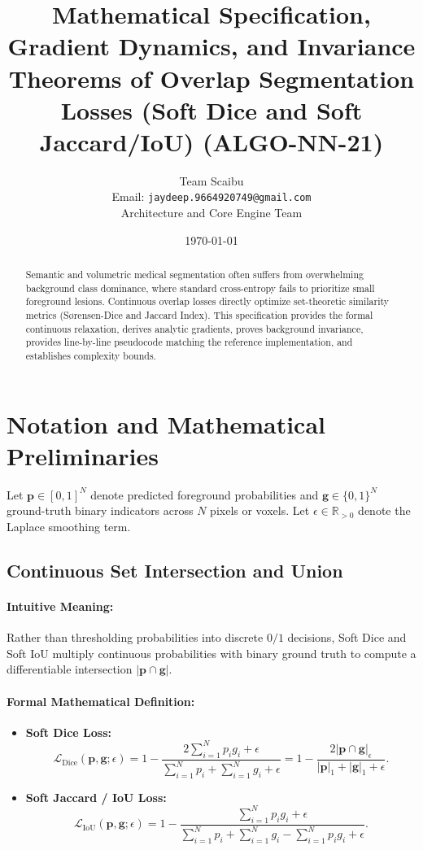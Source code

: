 \documentclass[11pt]{article}
\title{\textbf{Mathematical Specification, Gradient Dynamics, and Invariance Theorems of Overlap Segmentation Losses (Soft Dice and Soft Jaccard/IoU) (ALGO-NN-21)}}
\author{Team Scaibu \\ \small Email: \texttt{jaydeep.9664920749@gmail.com} \\ \small Architecture and Core Engine Team}
\date{\today}
\begin{document}
\maketitle

\begin{abstract}
Semantic and volumetric medical segmentation often suffers from overwhelming background class dominance, where standard cross-entropy fails to prioritize small foreground lesions. Continuous overlap losses directly optimize set-theoretic similarity metrics (S{\o}rensen-Dice and Jaccard Index). This specification provides the formal continuous relaxation, derives analytic gradients, proves background invariance, provides line-by-line pseudocode matching the reference implementation, and establishes complexity bounds.
\end{abstract}

\section{Notation and Mathematical Preliminaries}
\label{sec:notation}

Let $\mathbf{p} \in [0, 1]^N$ denote predicted foreground probabilities and $\mathbf{g} \in \{0, 1\}^N$ ground-truth binary indicators across $N$ pixels or voxels. Let $\epsilon \in \mathbb{R}_{>0}$ denote the Laplace smoothing term.

\subsection{Continuous Set Intersection and Union}
\paragraph{Intuitive Meaning:} Rather than thresholding probabilities into discrete $0/1$ decisions, Soft Dice and Soft IoU multiply continuous probabilities with binary ground truth to compute a differentiable intersection $|\mathbf{p} \cap \mathbf{g}|$.

\paragraph{Formal Mathematical Definition:}
\begin{itemize}
    \item \textbf{Soft Dice Loss:}
    \begin{equation}
    \label{eq:soft_dice}
    \mathcal{L}_{\mathrm{Dice}}(\mathbf{p}, \mathbf{g}; \epsilon) = 1 - \frac{2 \sum_{i=1}^N p_i g_i + \epsilon}{\sum_{i=1}^N p_i + \sum_{i=1}^N g_i + \epsilon} = 1 - \frac{2 |\mathbf{p} \cap \mathbf{g}|_\epsilon}{|\mathbf{p}|_1 + |\mathbf{g}|_1 + \epsilon}.
    \end{equation}
    \item \textbf{Soft Jaccard / IoU Loss:}
    \begin{equation}
    \label{eq:soft_iou}
    \mathcal{L}_{\mathrm{IoU}}(\mathbf{p}, \mathbf{g}; \epsilon) = 1 - \frac{\sum_{i=1}^N p_i g_i + \epsilon}{\sum_{i=1}^N p_i + \sum_{i=1}^N g_i - \sum_{i=1}^N p_i g_i + \epsilon}.
    \end{equation}
\end{itemize}
\end{document}
